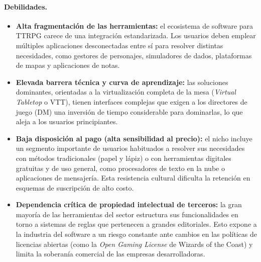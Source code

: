 \paragraph{Debilidades.}
\begin{itemize}
  \item \textbf{Alta fragmentación de las herramientas:} el ecosistema de software para TTRPG carece de una integración estandarizada. Los usuarios deben emplear múltiples aplicaciones desconectadas entre sí para resolver distintas necesidades, como gestores de personajes, simuladores de dados, plataformas de mapas y aplicaciones de notas.
  \item \textbf{Elevada barrera técnica y curva de aprendizaje:} las soluciones dominantes, orientadas a la virtualización completa de la mesa (\textit{Virtual Tabletop} o VTT), tienen interfaces complejas que exigen a los directores de juego (DM) una inversión de tiempo considerable para dominarlas, lo que aleja a los usuarios principiantes.
  \item \textbf{Baja disposición al pago (alta sensibilidad al precio):} el nicho incluye un segmento importante de usuarios habituados a resolver sus necesidades con métodos tradicionales (papel y lápiz) o con herramientas digitales gratuitas y de uso general, como procesadores de texto en la nube o aplicaciones de mensajería. Esta resistencia cultural dificulta la retención en esquemas de suscripción de alto costo.
  \item \textbf{Dependencia crítica de propiedad intelectual de terceros:} la gran mayoría de las herramientas del sector estructura sus funcionalidades en torno a sistemas de reglas que pertenecen a grandes editoriales. Esto expone a la industria del software a un riesgo constante ante cambios en las políticas de licencias abiertas (como la \textit{Open Gaming License} de Wizards of the Coast) y limita la soberanía comercial de las empresas desarrolladoras.
\end{itemize}
